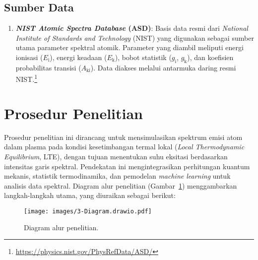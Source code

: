 \subsection{Sumber Data}
\begin{enumerate}
\item \textbf{\textit{NIST Atomic Spectra Database} (ASD)}: Basis data resmi dari \textit{National Institute of Standards and Technology }(NIST) yang digunakan sebagai sumber utama parameter spektral atomik. Parameter yang diambil meliputi energi ionisasi (\(E_\text{i}\)), energi keadaan (\(E_\text{k}\)), bobot statistik (\(g_\text{i}\), \(g_\text{k}\)), dan koefisien probabilitas transisi (\(A_\text{ki}\)). Data diakses melalui antarmuka daring resmi NIST.\footnote{\url{https://physics.nist.gov/PhysRefData/ASD/}}
\end{enumerate}

\section{Prosedur Penelitian}

Prosedur penelitian ini dirancang untuk mensimulasikan spektrum emisi atom dalam plasma pada kondisi kesetimbangan termal lokal (\textit{Local Thermodynamic Equilibrium}, LTE), dengan tujuan menentukan suhu eksitasi berdasarkan intensitas garis spektral. Pendekatan ini mengintegrasikan perhitungan kuantum mekanis, statistik termodinamika, dan pemodelan \textit{machine learning} untuk analisis data spektral. Diagram alur penelitian (Gambar~\ref{fig:3-diagram}) menggambarkan langkah-langkah utama, yang diuraikan sebagai berikut:

\begin{figure}[H]
    \centering
    \texttt{[image: images/3-Diagram.drawio.pdf]}
    \caption{Diagram alur penelitian.}
    \label{fig:3-diagram}
\end{figure}

